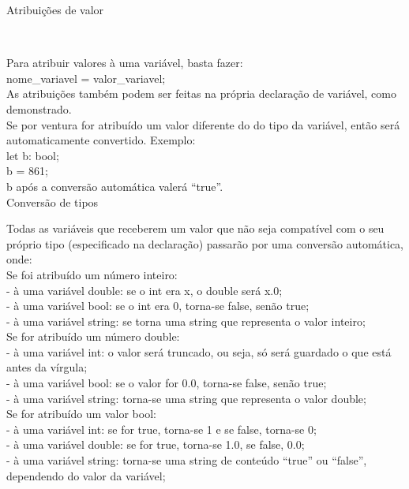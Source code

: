 \documentclass[12pt,a4paper]{article}
\begin{document}
\hypertarget{label2}{\Large{Atribuições de valor}}\\[0.3cm]
\normalsize

Para atribuir valores à uma variável, basta fazer: \\

nome\_variavel = valor\_variavel; \\

As atribuições também podem ser feitas na própria declaração de variável, como demonstrado. \\

Se por ventura for atribuído um valor diferente do do tipo da variável, então será automaticamente convertido. Exemplo:\\

let b: bool; \\

b = 861;\\

b após a conversão automática valerá ``true''.\\

\hypertarget{label8}{\Large{Conversão de tipos}}\\[0.3cm]
\normalsize

Todas as variáveis que receberem um valor que não seja compatível com o seu próprio tipo (especificado na declaração) passarão por uma conversão automática, onde: \\

Se foi atribuído um número inteiro:\\[0.15cm]
- à uma variável double: se o int era x, o double será x.0;\\
- à uma variável bool: se o int era 0, torna-se false, senão true;\\
- à uma variável string: se torna uma string que representa o valor inteiro;\\[0.3cm]

Se for atribuído um número double:\\[0.15cm]
- à uma variável int: o valor será truncado, ou seja, só será guardado o que está antes da vírgula;\\
- à uma variável bool: se o valor for 0.0, torna-se false, senão true;\\
- à uma variável string: torna-se uma string que representa o valor double;\\[0.3cm]

Se for atribuído um valor bool:\\[0.15cm]
- à uma variável int: se for true, torna-se 1 e se false, torna-se 0;\\
- à uma variável double: se for true, torna-se 1.0, se false, 0.0;\\
- à uma variável string: torna-se uma string de conteúdo ``true'' ou ``false'', dependendo do valor da variável;\\[0.3cm]
\end{document}
